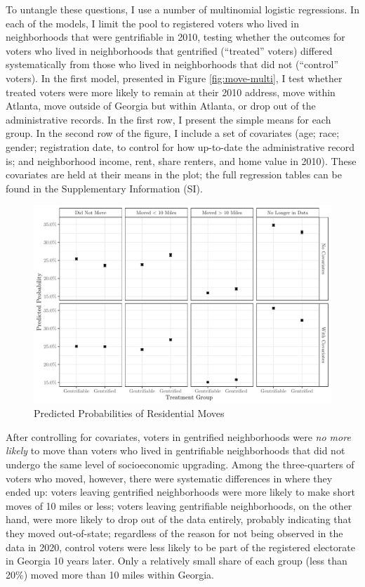 \documentclass[
  12pt,
]{article}
\begin{document}
To untangle these questions, I use a number of multinomial logistic regressions. In each of the models, I limit the pool to registered voters who lived in neighborhoods that were gentrifiable in 2010, testing whether the outcomes for voters who lived in neighborhoods that gentrified (``treated'' voters) differed systematically from those who lived in neighborhoods that did not (``control'' voters). In the first model, presented in Figure \ref{fig:move-multi}, I test whether treated voters were more likely to remain at their 2010 address, move within Atlanta, move outside of Georgia but within Atlanta, or drop out of the administrative records. In the first row, I present the simple means for each group. In the second row of the figure, I include a set of covariates (age; race; gender; registration date, to control for how up-to-date the administrative record is; and neighborhood income, rent, share renters, and home value in 2010). These covariates are held at their means in the plot; the full regression tables can be found in the Supplementary Information (SI).

\begin{figure}[H]

{\centering \includegraphics{gentrification_files/figure-latex/move-marg-1} 

}

\caption{\label{fig:move-multi}Predicted Probabilities of Residential Moves}\label{fig:move-marg}
\end{figure}

After controlling for covariates, voters in gentrified neighborhoods were \emph{no more likely} to move than voters who lived in gentrifiable neighborhoods that did not undergo the same level of socioeconomic upgrading. Among the three-quarters of voters who moved, however, there were systematic differences in where they ended up: voters leaving gentrified neighborhoods were more likely to make short moves of 10 miles or less; voters leaving gentrifiable neighborhoods, on the other hand, were more likely to drop out of the data entirely, probably indicating that they moved out-of-state; regardless of the reason for not being observed in the data in 2020, control voters were less likely to be part of the registered electorate in Georgia 10 years later. Only a relatively small share of each group (less than 20\%) moved more than 10 miles within Georgia.
\end{document}
